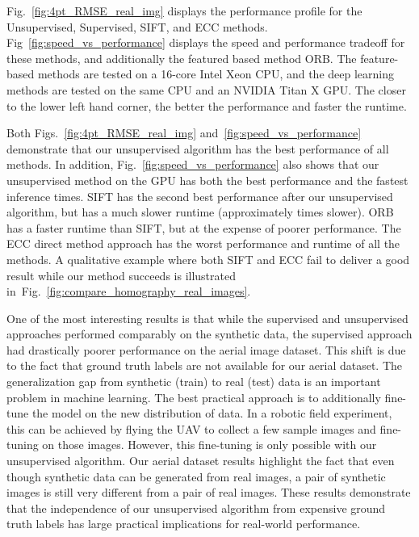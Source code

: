 \documentclass[letterpaper, 10 pt, conference]{ieeeconf}
\begin{document}
Fig.~\ref{fig:4pt_RMSE_real_img} displays the performance profile for the Unsupervised, Supervised, SIFT, and ECC methods. Fig~\ref{fig:speed_vs_performance} displays the speed and performance tradeoff for these methods, and additionally the featured based method ORB. The feature-based methods are tested on a 16-core Intel Xeon CPU, and the deep learning methods are tested on the same CPU and an NVIDIA Titan X GPU. The closer to the lower left hand corner, the better the performance and faster the runtime.

Both Figs.~\ref{fig:4pt_RMSE_real_img} and~\ref{fig:speed_vs_performance} demonstrate that our unsupervised algorithm has the best performance of all methods. In addition, Fig.~\ref{fig:speed_vs_performance} also shows that our unsupervised method on the GPU has both the best performance and the fastest inference times. SIFT has the second best performance after our unsupervised algorithm, but has a much slower runtime (approximately  times slower). ORB has a faster runtime than SIFT, but at the expense of poorer performance. The ECC direct method approach has the worst performance and runtime of all the methods. A qualitative example where both SIFT and ECC fail to deliver a good result while our method succeeds is illustrated in~Fig.~\ref{fig:compare_homography_real_images}.

One of the most interesting results is that while the supervised and unsupervised approaches performed comparably on the synthetic data, the supervised approach had drastically poorer performance on the aerial image dataset. This shift is due to the fact that ground truth labels are not available for our aerial dataset. The generalization gap from synthetic (train) to real (test) data is an important problem in machine learning. The best practical approach is to additionally fine-tune the model on the new distribution of data. In a robotic field experiment, this can be achieved by flying the UAV to collect a few sample images and fine-tuning on those images. However, this fine-tuning is only possible with our unsupervised algorithm. Our aerial dataset results highlight the fact that even though synthetic data can be generated from real images, a pair of synthetic images is still very different from a pair of real images. These results demonstrate that the independence of our unsupervised algorithm from expensive ground truth labels has large practical implications for real-world performance.
\end{document}
